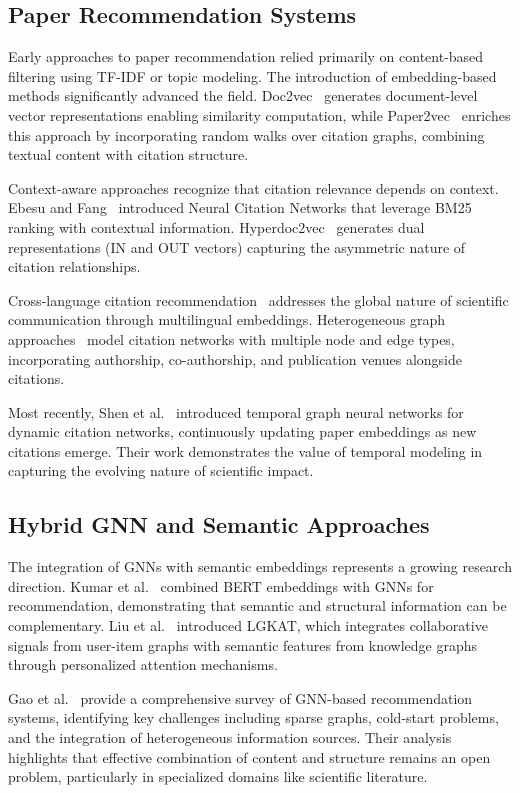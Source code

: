 \documentclass[pdflatex,sn-mathphys-num]{sn-jnl}
\theoremstyle{thmstyleone}%
\theoremstyle{thmstyletwo}%
\theoremstyle{thmstylethree}%
\begin{document}
\subsection{Paper Recommendation Systems}

Early approaches to paper recommendation relied primarily on content-based filtering using TF-IDF or topic modeling. The introduction of embedding-based methods significantly advanced the field. Doc2vec~\cite{doc2vec} generates document-level vector representations enabling similarity computation, while Paper2vec~\cite{paper2vec} enriches this approach by incorporating random walks over citation graphs, combining textual content with citation structure.

Context-aware approaches recognize that citation relevance depends on context. Ebesu and Fang~\cite{bm25_ncn} introduced Neural Citation Networks that leverage BM25 ranking with contextual information. Hyperdoc2vec~\cite{hyperdoc2vec} generates dual representations (IN and OUT vectors) capturing the asymmetric nature of citation relationships.

Cross-language citation recommendation~\cite{crosslang} addresses the global nature of scientific communication through multilingual embeddings. Heterogeneous graph approaches~\cite{hgt} model citation networks with multiple node and edge types, incorporating authorship, co-authorship, and publication venues alongside citations.

Most recently, Shen et al.~\cite{shen2024temporal} introduced temporal graph neural networks for dynamic citation networks, continuously updating paper embeddings as new citations emerge. Their work demonstrates the value of temporal modeling in capturing the evolving nature of scientific impact.

\subsection{Hybrid GNN and Semantic Approaches}

The integration of GNNs with semantic embeddings represents a growing research direction. Kumar et al.~\cite{hybrid2023bert} combined BERT embeddings with GNNs for recommendation, demonstrating that semantic and structural information can be complementary. Liu et al.~\cite{liu2025lgkat} introduced LGKAT, which integrates collaborative signals from user-item graphs with semantic features from knowledge graphs through personalized attention mechanisms.

Gao et al.~\cite{gao2022graph} provide a comprehensive survey of GNN-based recommendation systems, identifying key challenges including sparse graphs, cold-start problems, and the integration of heterogeneous information sources. Their analysis highlights that effective combination of content and structure remains an open problem, particularly in specialized domains like scientific literature.
\end{document}

